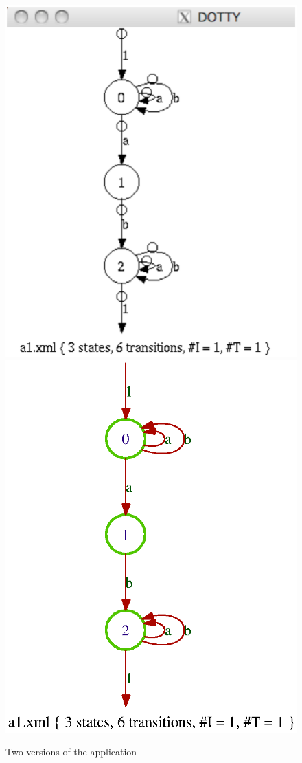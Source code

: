 \begin{figure}[ht]
    \centering
\includegraphics[scale=0.25]{figures/a1-dotty.ps}
\ee
\includegraphics[scale=0.5]{figures/a1-gv.ps}
\caption{Two versions of the  application}
\label{fig:gra-viz}%
\end{figure}



\endinput
